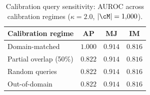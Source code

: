 \begin{table}[h]
  \centering
  \small
  \caption{Calibration query sensitivity: \memsad{} AUROC across calibration regimes ($\kappa=2.0$, $|\cM|=1{,}000$).}
  \label{tab:calibration_sensitivity}
  \begin{tabular}{l ccc}
    \toprule
    Calibration regime & AP & MJ & IM \\
    \midrule
    Domain-matched & $1.000$ & $0.914$ & $0.816$ \\
    Partial overlap (50\%) & $0.822$ & $0.914$ & $0.816$ \\
    Random queries & $0.822$ & $0.914$ & $0.816$ \\
    Out-of-domain & $0.822$ & $0.914$ & $0.816$ \\
    \bottomrule
  \end{tabular}
\end{table}
